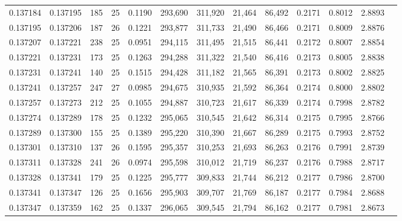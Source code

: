 \begin{tabular}{rrrrrrrrrrrrr}
0.137184 & 0.137195 &   185 &  25 &                                     0.1190 & 293,690 & 311,920 &  21,464 &  86,492 & 0.2171 & 0.8012 & 2.8893 \\
0.137195 & 0.137206 &   187 &  26 &                                     0.1221 & 293,877 & 311,733 &  21,490 &  86,466 & 0.2171 & 0.8009 & 2.8876 \\
0.137207 & 0.137221 &   238 &  25 &                                     0.0951 & 294,115 & 311,495 &  21,515 &  86,441 & 0.2172 & 0.8007 & 2.8854 \\
0.137221 & 0.137231 &   173 &  25 &                                     0.1263 & 294,288 & 311,322 &  21,540 &  86,416 & 0.2173 & 0.8005 & 2.8838 \\
0.137231 & 0.137241 &   140 &  25 &                                     0.1515 & 294,428 & 311,182 &  21,565 &  86,391 & 0.2173 & 0.8002 & 2.8825 \\
0.137241 & 0.137257 &   247 &  27 &                                     0.0985 & 294,675 & 310,935 &  21,592 &  86,364 & 0.2174 & 0.8000 & 2.8802 \\
0.137257 & 0.137273 &   212 &  25 &                                     0.1055 & 294,887 & 310,723 &  21,617 &  86,339 & 0.2174 & 0.7998 & 2.8782 \\
0.137274 & 0.137289 &   178 &  25 &                                     0.1232 & 295,065 & 310,545 &  21,642 &  86,314 & 0.2175 & 0.7995 & 2.8766 \\
0.137289 & 0.137300 &   155 &  25 &                                     0.1389 & 295,220 & 310,390 &  21,667 &  86,289 & 0.2175 & 0.7993 & 2.8752 \\
0.137301 & 0.137310 &   137 &  26 &                                     0.1595 & 295,357 & 310,253 &  21,693 &  86,263 & 0.2176 & 0.7991 & 2.8739 \\
0.137311 & 0.137328 &   241 &  26 &                                     0.0974 & 295,598 & 310,012 &  21,719 &  86,237 & 0.2176 & 0.7988 & 2.8717 \\
0.137328 & 0.137341 &   179 &  25 &                                     0.1225 & 295,777 & 309,833 &  21,744 &  86,212 & 0.2177 & 0.7986 & 2.8700 \\
0.137341 & 0.137347 &   126 &  25 &                                     0.1656 & 295,903 & 309,707 &  21,769 &  86,187 & 0.2177 & 0.7984 & 2.8688 \\
0.137347 & 0.137359 &   162 &  25 &                                     0.1337 & 296,065 & 309,545 &  21,794 &  86,162 & 0.2177 & 0.7981 & 2.8673 \\

\end{tabular}
